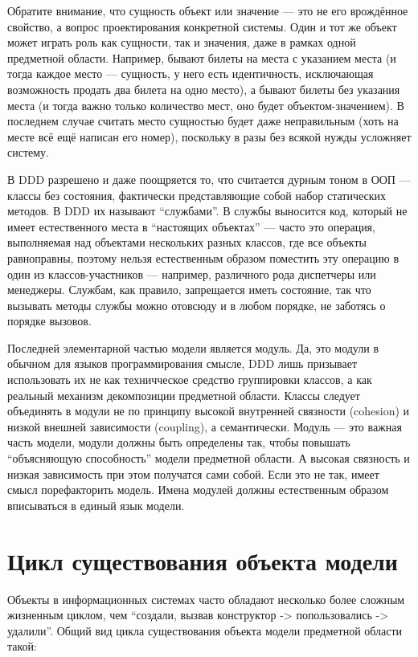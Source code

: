 \documentclass[a5paper]{article}
\begin{document}
Обратите внимание, что сущность объект или значение --- это не его врождённое свойство, а вопрос проектирования конкретной системы. Один и тот же объект может играть роль как сущности, так и значения, даже в рамках одной предметной области. Например, бывают билеты на места с указанием места (и тогда каждое место --- сущность, у него есть идентичность, исключающая возможность продать два билета на одно место), а бывают билеты без указания места (и тогда важно только количество мест, оно будет объектом-значением). В последнем случае считать место сущностью будет даже неправильным (хоть на месте всё ещё написан его номер), поскольку в разы без всякой нужды усложняет систему.

В DDD разрешено и даже поощряется то, что считается дурным тоном в ООП --- классы без состояния, фактически представляющие собой набор статических методов. В DDD их называют ``службами''. В службы выносится код, который не имеет естественного места в ``настоящих объектах'' --- часто это операция, выполняемая над объектами нескольких разных классов, где все объекты равноправны, поэтому нельзя естественным образом поместить эту операцию в один из классов-участников --- например, различного рода диспетчеры или менеджеры. Службам, как правило, запрещается иметь состояние, так что вызывать методы службы можно отовсюду и в любом порядке, не заботясь о порядке вызовов.

Последней элементарной частью модели является модуль. Да, это модули в обычном для языков программирования смысле, DDD лишь призывает использовать их не как техничческое средство группировки классов, а как реальный механизм декомпозиции предметной области. Классы следует объединять в модули не по принципу высокой внутренней связности (cohesion) и низкой внешней зависимости (coupling), а семантически. Модуль --- это важная часть модели, модули должны быть определены так, чтобы повышать ``объясняющую способность'' модели предметной области. А высокая связность и низкая зависимость при этом получатся сами собой. Если это не так, имеет смысл порефакторить модель. Имена модулей должны естественным образом вписываться в единый язык модели.

\section{Цикл существования объекта модели}

Объекты в информационных системах часто обладают несколько более сложным жизненным циклом, чем ``создали, вызвав конструктор -> попользовались -> удалили''. Общий вид цикла существования объекта модели предметной области такой:
\end{document}
